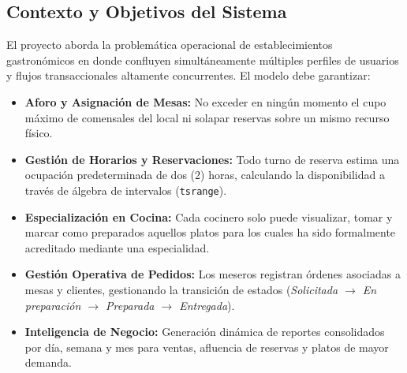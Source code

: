 \documentclass[11pt,letterpaper]{article}
\begin{document}
\subsection{Contexto y Objetivos del Sistema}
El proyecto aborda la problemática operacional de establecimientos gastronómicos en donde confluyen simultáneamente múltiples perfiles de usuarios y flujos transaccionales altamente concurrentes. El modelo debe garantizar:
\begin{itemize}[leftmargin=*]
    \item \textbf{Aforo y Asignación de Mesas:} No exceder en ningún momento el cupo máximo de comensales del local ni solapar reservas sobre un mismo recurso físico.
    \item \textbf{Gestión de Horarios y Reservaciones:} Todo turno de reserva estima una ocupación predeterminada de dos (2) horas, calculando la disponibilidad a través de álgebra de intervalos (\texttt{tsrange}).
    \item \textbf{Especialización en Cocina:} Cada cocinero solo puede visualizar, tomar y marcar como preparados aquellos platos para los cuales ha sido formalmente acreditado mediante una especialidad.
    \item \textbf{Gestión Operativa de Pedidos:} Los meseros registran órdenes asociadas a mesas y clientes, gestionando la transición de estados (\textit{Solicitada $\rightarrow$ En preparación $\rightarrow$ Preparada $\rightarrow$ Entregada}).
    \item \textbf{Inteligencia de Negocio:} Generación dinámica de reportes consolidados por día, semana y mes para ventas, afluencia de reservas y platos de mayor demanda.
\end{itemize}
\end{document}
